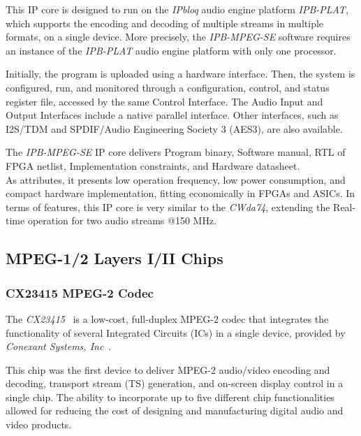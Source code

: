 This IP core is designed to run on the \textit{IPbloq} audio engine platform \textit{IPB-PLAT}, which supports the encoding and decoding of multiple streams in multiple formats, on a single device. More precisely, the \textit{IPB-MPEG-SE} software requires an instance of the \textit{IPB-PLAT} audio engine platform with only one processor. 

Initially, the program is uploaded using a hardware interface. Then, the system is configured, run, and monitored through a configuration, control, and status register file, accessed by the same Control Interface.
The Audio Input and Output Interfaces include a native parallel interface. Other interfaces, such as I2S/TDM and SPDIF/Audio Engineering Society 3 (AES3), are also available.

The \textit{IPB-MPEG-SE} IP core delivers Program binary, Software manual, RTL of FPGA netlist, Implementation constraints, and Hardware datasheet.\\
As attributes, it presents low operation frequency, low power consumption, and compact hardware implementation, fitting economically in FPGAs and ASICs.
In terms of features, this IP core is very similar to the \textit{CWda74}, extending the Real-time operation for two audio streams @150 MHz.\\


\subsection{MPEG-1/2 Layers I/II Chips}

\subsubsection{CX23415 MPEG-2 Codec}

The \textit{CX23415}~\cite{cx23415} is a low-cost, full-duplex MPEG-2 codec that integrates the functionality of several Integrated Circuits (ICs) in a single device, provided by \textit{Conexant Systems, Inc}~\cite{conexant}.

This chip was the first device to deliver MPEG-2 audio/video encoding and decoding, transport stream (TS) generation, and on-screen display control in a single chip. The ability to incorporate up to five different chip functionalities allowed for reducing the cost of designing and manufacturing digital audio and video products.


